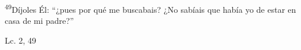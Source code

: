 \documentclass[../../rosario.tex]{subfiles}
\begin{document}
    \textsuperscript{49}Díjoles Él: ``¿pues por qué me buscabais? ¿No sabíais que había yo de estar en casa de mi padre?''
    \begin{flushright}
    Lc. 2, 49        
    \end{flushright}
\end{document}
